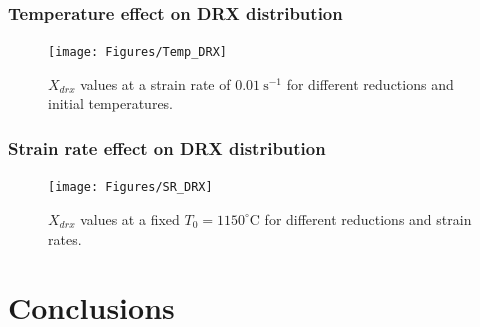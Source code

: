 \documentclass[metals,article,submit,pdftex,moreauthors]{Definitions/mdpi}
\begin{document}
\subsubsection{Temperature effect on DRX distribution\label{subsec:TempEffect}}
\begin{figure}[H]
\texttt{[image: Figures/Temp\_DRX]}
\caption{$X_{drx}$ values at a strain rate of $0.01~\text{s}^{-1}$ for different reductions and initial temperatures.}
\label{fig:TempEffect}
\end{figure}
\subsubsection{Strain rate effect on DRX distribution\label{subsec:SRatEffect}}
\begin{figure}[H]
\texttt{[image: Figures/SR\_DRX]}
\caption{$X_{drx}$ values at a fixed $T_0=1150^\circ$C for different reductions and strain rates.}
\label{fig:SREffect}
\end{figure}
\section{Conclusions\label{sec:Conclusions}}


\vspace{6pt}


\end{document}
